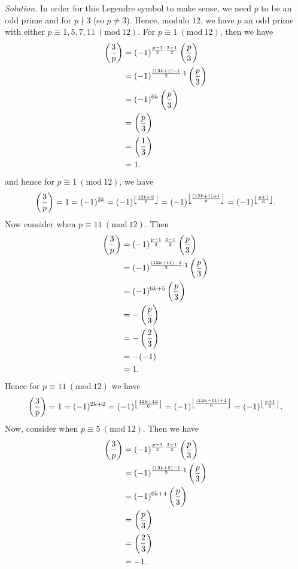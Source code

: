 \documentclass{article}
\newcommand{\Mod}[1]{\ (\mathrm{mod}\ #1)}
\newcommand{\Leg}[2]{\del{\frac{#1}{#2}}}
\DeclarePairedDelimiter\floor{\lfloor}{\rfloor}
\begin{document}
\textit{Solution.}
In order for this Legendre symbol to make sense, we need $p$ to be an odd prime
and for $p \nmid 3$ (so $p \neq 3$). Hence, modulo $12$, we have
$p$ an odd prime with either $p \equiv 1, 5, 7, 11 \Mod{12}$.
For $p \equiv 1 \Mod{12}$, then we have
%
\begin{align*}
    \Leg{3}{p}
    &= (-1)^{\frac{p - 1}{2} \cdot \frac{3 - 1}{2}} \Leg{p}{3} \\
    &= (-1)^{\frac{(12 k + 1) - 1}{2} \cdot 1} \Leg{p}{3} \\
    &= (-1)^{6 k} \Leg{p}{3} \\
    &= \Leg{p}{3} \\
    &= \Leg{1}{3} \\
    &= 1
    .
\end{align*}
%
and hence for $p \equiv 1 \Mod{12}$, we have
%
\begin{equation*}
    \Leg{3}{p}
    = 1
    = (-1)^{2 k}
    = (-1)^{\floor*{\frac{12 k + 2}{6}}}
    = (-1)^{\floor*{\frac{(12 k + 1) + 1}{6}}}
    = (-1)^{\floor*{\frac{p + 1}{6}}}
    .
\end{equation*}
%
Now consider when $p \equiv 11 \Mod{12}$. Then
%
\begin{align*}
    \Leg{3}{p}
    &= (-1)^{\frac{p - 1}{2} \cdot \frac{3 - 1}{2}} \Leg{p}{3} \\
    &= (-1)^{\frac{(12 k + 11) - 1}{2} \cdot 1} \Leg{p}{3} \\
    &= (-1)^{6 k + 5} \Leg{p}{3} \\
    &= - \Leg{p}{3} \\
    &= - \Leg{2}{3} \\
    &= - (-1) \\
    &= 1
    .
\end{align*}
%
Hence for $p \equiv 11 \Mod{12}$ we have
%
\begin{equation*}
    \Leg{3}{p}
    = 1
    = (-1)^{2 k + 2}
    = (-1)^{\floor*{\frac{12 k + 12}{6}}}
    = (-1)^{\floor*{\frac{(12 k + 11) + 1}{6}}}
    = (-1)^{\floor*{\frac{p + 1}{6}}}
    .
\end{equation*}
%
Now, consider when $p \equiv 5 \Mod{12}$. Then we have
%
\begin{align*}
    \Leg{3}{p}
    &= (-1)^{\frac{p - 1}{2} \cdot \frac{3 - 1}{2}} \Leg{p}{3} \\
    &= (-1)^{\frac{(12 k + 5) - 1}{2} \cdot 1} \Leg{p}{3} \\
    &= (-1)^{6 k + 4} \Leg{p}{3} \\
    &= \Leg{p}{3} \\
    &= \Leg{2}{3} \\
    &= -1
    .
\end{align*}
\end{document}
